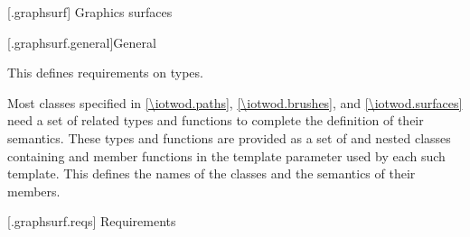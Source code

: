 
 [\iotwod.graphsurf] {Graphics surfaces}

 [\iotwod.graphsurf.general]{General}

\pnum
This \clause{} defines requirements on \term{\graphicssurfacestemplparamnospace} types.

\pnum
Most classes specified in \ref{\iotwod.paths}, \ref{\iotwod.brushes}, and \ref{\iotwod.surfaces} need a set of related types and functions to complete the definition of their semantics. These types and functions are provided as a set of  and nested classes containing  and  member functions in the template parameter \tcode{\graphicssurfacestemplparamnospace} used by each such template. This \clause{} defines the names of the classes and the semantics of their members.

 [\iotwod.graphsurf.reqs] {Requirements}








